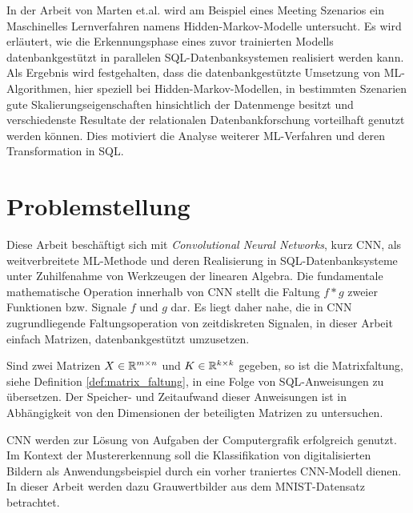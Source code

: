 In der Arbeit von Marten et.al.\cite{marten2017machine} wird am Beispiel eines Meeting Szenarios ein Maschinelles Lernverfahren namens Hidden-Markov-Modelle untersucht. Es wird erläutert, wie die Erkennungsphase eines zuvor trainierten Modells datenbankgestützt in parallelen SQL-Datenbanksystemen realisiert werden kann.   
Als Ergebnis wird festgehalten, dass die datenbankgestützte Umsetzung von ML-Algorithmen, hier speziell bei Hidden-Markov-Modellen, in bestimmten Szenarien gute Skalierungseigenschaften hinsichtlich der Datenmenge besitzt und verschiedenste Resultate der relationalen Datenbankforschung vorteilhaft genutzt werden können. Dies motiviert die Analyse weiterer ML-Verfahren und deren Transformation in SQL. 

\section*{Problemstellung}
\label{abs:problemstellung}
Diese Arbeit beschäftigt sich mit \textit{Convolutional Neural Networks}, kurz CNN, als weitverbreitete ML-Methode und deren Realisierung in SQL-Datenbanksysteme unter Zuhilfenahme von Werkzeugen der linearen Algebra. Die fundamentale mathematische Operation innerhalb von CNN stellt die Faltung $ f \ast g$ zweier Funktionen bzw. Signale $f$ und $g$ dar. 
Es liegt daher nahe, die in CNN zugrundliegende Faltungsoperation von zeitdiskreten Signalen, in dieser Arbeit einfach Matrizen, datenbankgestützt umzusetzen.

\begin{problem}
    \label{prob:conv_in_sql}
Sind zwei Matrizen $X \in \mathbb{R}^{m \times n}$ und $K \in \mathbb{R}^{k \times k}$ gegeben, so ist die Matrixfaltung, siehe Definition \ref{def:matrix_faltung}, in eine Folge von SQL-Anweisungen zu übersetzen. Der Speicher- und Zeitaufwand dieser Anweisungen ist in Abhängigkeit von den Dimensionen der beteiligten Matrizen zu untersuchen.   
\end{problem}

CNN werden zur Lösung von Aufgaben der Computergrafik\cite{DBLP:conf/nips/KrizhevskySH12, DBLP:journals/pieee/LeCunBBH98,DBLP:conf/cvpr/CiresanMS12} erfolgreich genutzt.
Im Kontext der Mustererkennung soll die Klassifikation von digitalisierten Bildern als Anwendungsbeispiel durch ein vorher traniertes CNN-Modell dienen. In dieser Arbeit werden dazu Grauwertbilder aus dem MNIST-Datensatz\cite{lecun1998gradient} betrachtet. 

